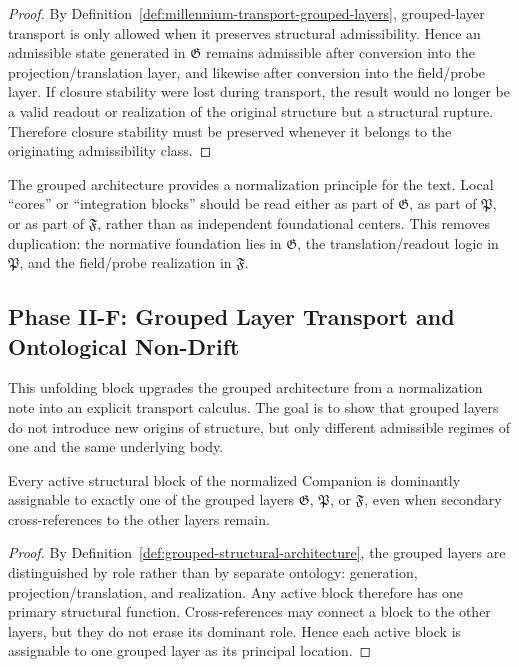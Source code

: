 \begin{proof}
By Definition~\ref{def:millennium-transport-grouped-layers}, grouped-layer
transport is only allowed when it preserves structural admissibility. Hence an
admissible state generated in $\mathfrak G$ remains admissible after conversion
into the projection/translation layer, and likewise after conversion into the
field/probe layer. If closure stability were lost during transport, the result
would no longer be a valid readout or realization of the original structure but
a structural rupture. Therefore closure stability must be preserved whenever it
belongs to the originating admissibility class.
\end{proof}

\begin{remark}
\label{rem:document-normalization-consequence}
The grouped architecture provides a normalization principle for the text. Local
``cores'' or ``integration blocks'' should be read either as part of
$\mathfrak G$, as part of $\mathfrak P$, or as part of $\mathfrak F$, rather than as
independent foundational centers. This removes duplication: the normative
foundation lies in $\mathfrak G$, the translation/readout logic in $\mathfrak P$,
and the field/probe realization in $\mathfrak F$.
\end{remark}

\subsection*{Phase II-F: Grouped Layer Transport and Ontological Non-Drift}

This unfolding block upgrades the grouped architecture from a normalization note
into an explicit transport calculus. The goal is to show that grouped layers do
not introduce new origins of structure, but only different admissible regimes of
one and the same underlying body.

\begin{lemma}
\label{lem:group-decomposition}
Every active structural block of the normalized Companion is dominantly
assignable to exactly one of the grouped layers $\mathfrak G$, $\mathfrak P$, or
$\mathfrak F$, even when secondary cross-references to the other layers remain.
\end{lemma}

\begin{proof}
By Definition~\ref{def:grouped-structural-architecture}, the grouped layers are
distinguished by role rather than by separate ontology: generation,
projection/translation, and realization. Any active block therefore has one
primary structural function. Cross-references may connect a block to the other
layers, but they do not erase its dominant role. Hence each active block is
assignable to one grouped layer as its principal location.
\end{proof}

